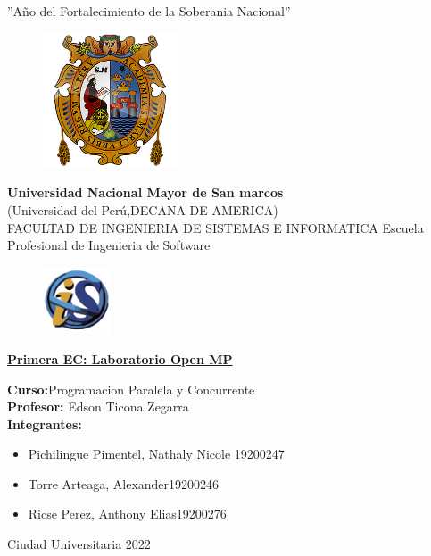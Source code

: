 \documentclass[12pt, letterpaper]{article}
\begin{document}
\begin{center}
    ''Año del Fortalecimiento de la Soberania Nacional''
    \vspace{5mm}
    \begin{figure}[h]
        \centering
        \includegraphics[width=4cm,height=4cm]{UNMSM}
    \end{figure}

    \textbf{Universidad Nacional Mayor de San marcos} \\
    (Universidad del Perú,DECANA DE AMERICA)\\
    \vspace{5mm}
    FACULTAD DE INGENIERIA DE SISTEMAS E INFORMATICA
    Escuela Profesional de Ingenieria de Software
    \begin{figure}[h]
        \centering   
        \includegraphics[width=2cm,height=2cm]{FISI}   
    \end{figure}

\textbf{\underline{Primera EC: Laboratorio Open MP}}

    \begin{flushleft}
    \textbf{Curso:}Programacion Paralela y Concurrente\\
    \vspace{2mm}
    \textbf{Profesor:} Edson Ticona Zegarra\\
    \vspace{2mm}
    \textbf{Integrantes:} 
    \begin{itemize}
        \item Pichilingue Pimentel, Nathaly Nicole\hspace{1cm} 19200247
        \item Torre Arteaga, Alexander\hspace{3.2cm}19200246
        \item Ricse Perez, Anthony Elias\hspace{3cm}19200276
    \end{itemize}
    \end{flushleft}

    Ciudad Universitaria 2022
 
\end{center}
\end{document}
